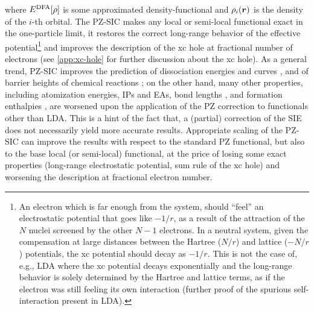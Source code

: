 where $E^{\rm DFA}[\rho]$ is some approximated density-functional and $\rho_i({\bm r})$ is the density of the $i$-th orbital. The PZ-SIC makes any local or semi-local functional exact in the one-particle limit, it restores the correct long-range behavior of the effective potential\footnote{An electron which is far enough from the system, should ``feel'' an electrostatic potential that goes like $-1/r$, as a result of the attraction of the $N$ nuclei screened by the other $N-1$ electrons. In a neutral system, given the compensation at large distances between the Hartree ($N/r$) and lattice ($-N/r$) potentials, the xc potential should decay as $-1/r$. This is not the case of, e.g., LDA where the xc potential decays exponentially and the long-range behavior is solely determined by the Hartree and lattice terms, as if the electron was still feeling its own interaction (further proof of the spurious self-interaction present in LDA).} and improves the description of the xc hole at fractional number of electrons \cite{perdew_what_1985} (see \cref{app:xc-hole} for further discussion about the xc hole). As a general trend, PZ-SIC improves the prediction of dissociation energies and curves \cite{ruzsinszky_density_2007}, and of barrier heights of chemical reactions \cite{vydrov_scaling_2006}; on the other hand, many other properties, including atomization energies, IPs and EAs, bond lengths \cite{vydrov_scaling_2006}, and formation enthalpies \cite{vydrov_effect_2004}, are worsened upon the application of the PZ correction to functionals other than LDA. This is a hint of the fact that, a (partial) correction of the SIE does not necessarily yield more accurate results. Appropriate scaling of the PZ-SIC can improve the results with respect to the standard PZ functional, but also to the base local (or semi-local) functional, at the price of losing some exact properties (long-range electrostatic potential, sum rule of the xc hole) \cite{ruzsinszky_density_2007} and worsening the description at fractional electron number.

